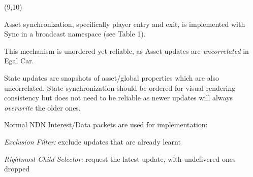 \documentclass[a0,portrait,svgnames]{a0poster}
\def\Subhead#1{
\noindent{\large \textcolor{BannerFourteenColor}{#1}}
}
\begin{document}
\begin{textblock}{7}(9,10)
 
  \Subhead{Asset Synchronization}
  
Asset synchronization, specifically player entry and exit, is implemented with Sync in a broadcast namespace (see Table 1). 

This mechanism is unordered yet reliable, as Asset updates are \emph{uncorrelated} in Egal Car.
  
 \Subhead{State Synchronization}
 
State updates are snapshots of asset\slash global properties which are also uncorrelated. State synchronization should be ordered for visual rendering consistency but does not need to be reliable as newer updates will always \emph{overwrite} the older ones.
 
Normal NDN Interest\slash Data packets are used for implementation:
\begin{itemize*}
\item \emph{Exclusion Filter:} exclude updates that are already learnt
\item \emph{Rightmost Child Selector:} request the latest update, with undelivered ones dropped
\end{itemize*}


 
  \Subhead{Event Synchronization}
 
 
 

\end{textblock}
\end{document}

